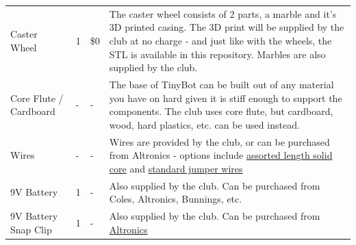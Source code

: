 \documentclass[a4paper,12pt]{article}
\begin{document}
\begin{xltabular}{\linewidth}{p{0.15\textwidth} p{0.05\textwidth} p{0.1\textwidth} X}
        Caster Wheel & 1 & \$0 & The caster wheel consists of 2 parts, a marble and it's 3D printed casing. The 3D print will be supplied by the club at no charge - and just like with the wheels, the STL is available in this repository. Marbles are also supplied by the club. \\[2.5cm]
        
        Core Flute / Cardboard & - & - & The base of TinyBot can be built out of any material you have on hard given it is stiff enough to support the components. The club uses core flute, but cardboard, wood, hard plastics, etc. can be used instead.\\[2.5cm]
        Wires & - & - & Wires are provided by the club, or can be purchased from Altronics - options include \href{https://www.altronics.com.au/p/p1018a-prototyping-breadboard-wire-packs-350pcs/}{assorted length solid core} and \href{https://www.altronics.com.au/p/p1017-prototyping-jumper-wires-mixed-for-breadboard-arduino/}{standard jumper wires}\\[1.5cm]
        9V Battery & 1 & - & Also supplied by the club. Can be purchased from Coles, Altronics, Bunnings, etc.\\[1cm]
        9V Battery Snap Clip & 1 & - & Also supplied by the club. Can be purchased from \href{https://www.altronics.com.au/p/p0455-9v-battery-snap/}{Altronics} \\[1cm]
        \bottomrule
    \end{xltabular}
\pagebreak
\end{document}
